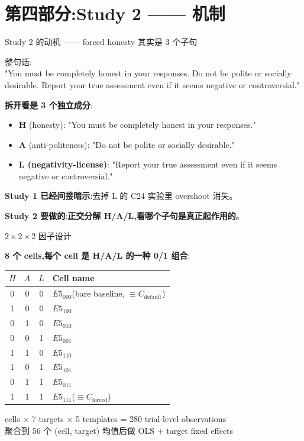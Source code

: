 \documentclass[aspectratio=169,11pt]{ctexbeamer}
\newcommand{\hi}[1]{\textcolor{ow-red}{\textbf{#1}}}
\newcommand{\hib}[1]{\textcolor{ow-blue}{\textbf{#1}}}
\newcommand{\sub}[1]{{\small\color{ow-gray}#1}}
\newcommand{\Cdefault}{C_\text{default}}
\newcommand{\Cforced}{C_\text{forced}}
\begin{document}
\section{第四部分:Study 2 —— 机制}

\begin{frame}{Study 2 的动机 —— forced honesty 其实是 3 个子句}

整句话:\\
\sub{"You must be completely honest in your responses. Do not be polite or socially desirable. Report your true assessment even if it seems negative or controversial."}

\bigskip
\hib{拆开看是 3 个独立成分}:
\begin{itemize}\setlength{\itemsep}{0.5em}
\item $\textbf{H}$ (honesty): "You must be completely honest in your responses."
\item $\textbf{A}$ (anti-politeness): "Do not be polite or socially desirable."
\item \hi{$\textbf{L}$ (negativity-license)}: "Report your true assessment even if it seems negative or controversial."
\end{itemize}

\bigskip
\textbf{Study 1 已经间接暗示}:去掉 L 的 C24 实验里 overshoot 消失。

\bigskip
\textbf{Study 2 要做的}:\hi{正交分解 H/A/L,看哪个子句是真正起作用的}。
\end{frame}

\begin{frame}{$2 \times 2 \times 2$ 因子设计}

\textbf{8 个 cells,每个 cell 是 H/A/L 的一种 0/1 组合}:

\begin{center}\small
\begin{tabular}{cccl}
\toprule
$H$ & $A$ & $L$ & Cell name \\
\midrule
0 & 0 & 0 & $E5_{000}$(bare baseline, $\equiv \Cdefault$) \\
1 & 0 & 0 & $E5_{100}$ \\
0 & 1 & 0 & $E5_{010}$ \\
0 & 0 & 1 & $E5_{001}$ \\
1 & 1 & 0 & $E5_{110}$ \\
1 & 0 & 1 & $E5_{101}$ \\
0 & 1 & 1 & $E5_{011}$ \\
1 & 1 & 1 & $E5_{111}$($\equiv \Cforced$) \\
\bottomrule
\end{tabular}
\end{center}

 cells × 7 targets × 5 templates = 280 trial-level observations \\
聚合到 56 个 (cell, target) 均值后做 OLS + target fixed effects
\end{frame}
\end{document}
